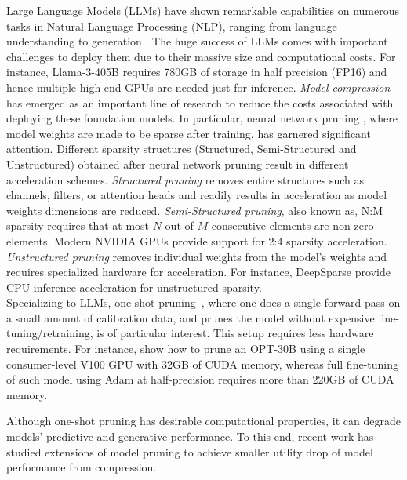 
Large Language Models (LLMs) have shown remarkable capabilities on numerous tasks in Natural Language Processing (NLP), 
ranging from language understanding to generation \cite{bubeck2023sparks, achiam2023gpt,team2023gemini, dubey2024llama}. The huge success of LLMs comes with important challenges to deploy them due to their massive size and computational costs. For instance,  Llama-3-405B \cite{dubey2024llama} requires 780GB of storage in half precision (FP16) and hence multiple high-end GPUs are needed just for inference. \textit{Model compression} has emerged as an important line of research to reduce the costs associated with deploying these foundation models. In particular, neural network pruning \cite{obd, hassibi1992second, benbaki2023fast}, where model weights are made to be sparse after training, has garnered significant attention. Different sparsity structures (Structured, Semi-Structured and Unstructured) obtained after neural network pruning result in different acceleration schemes. \textit{Structured pruning} removes entire structures such as channels, filters, or attention heads \cite{lebedev2016fast,wen2016learning,voita2019analyzing,el2022data} and readily results in acceleration as model weights dimensions are reduced. \textit{Semi-Structured pruning}, also known as, N:M sparsity \cite{zhou2021learning} requires that at most $N$ out of $M$ consecutive elements are non-zero elements. Modern NVIDIA GPUs provide support for 2:4 sparsity acceleration. \textit{Unstructured pruning} removes individual weights \cite{han2015learning, guo2016dynamic} from the model's weights and requires specialized hardware for acceleration. For instance, DeepSparse \cite{kurtic2022optimal, pmlr-v119-kurtz20a, DBLP:journals/corr/abs-2111-13445} provide CPU inference acceleration for unstructured sparsity.\\
Specializing to LLMs, one-shot pruning~\cite{meng2024alps, frantar2023sparsegpt, sun2023simple, zhang2023dynamic}, where one does a single forward pass on a small amount of calibration data, and prunes the model without expensive fine-tuning/retraining, is of particular interest. This setup requires less hardware requirements. For instance, \citet{meng2024alps} show how to prune an OPT-30B \cite{opt} using a single consumer-level V100 GPU with 32GB of CUDA memory, whereas full fine-tuning of such model using Adam \cite{kingma2014adam} at half-precision requires more than 220GB of CUDA memory.

Although one-shot pruning has desirable computational properties, it can degrade models' predictive and generative performance. To this end, recent work has studied extensions of model pruning to achieve smaller utility drop of model performance from compression. 

